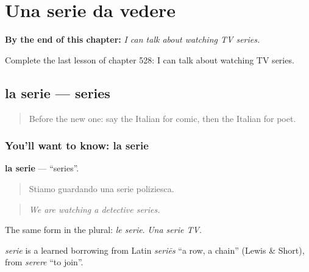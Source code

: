 
\chapter{Una serie da vedere}
\label{ch:it-una-serie-da-vedere}

\begin{chapteropening}
\textbf{By the end of this chapter:} \emph{I can talk about watching TV series.}

Complete the last lesson of chapter 528: I can talk about watching TV series.
\end{chapteropening}

\section[la serie]{la serie — series}

\label{lesson:IT-C528-serie}



\begin{quote}
Before the new one: say the Italian for comic, then the Italian for poet.
\end{quote}

\subsection*{You'll want to know: la serie}
\textbf{la serie} — \textquotedblleft{}series\textquotedblright{}.

\begin{quote}
Stiamo guardando una serie poliziesca.
\end{quote}

\begin{quote}
\emph{We are watching a detective series.}
\end{quote}

The same form in the plural: \emph{le serie}. \emph{Una serie TV}.

\begin{cousinweb}
\emph{serie} is a learned borrowing from Latin \emph{seriēs} \textquotedblleft{}a row, a chain\textquotedblright{} (Lewis \& Short), from \emph{serere} \textquotedblleft{}to join\textquotedblright{}.
\end{cousinweb}

